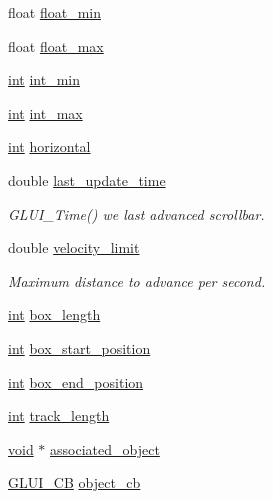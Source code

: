 \begin{DoxyCompactItemize}
float \hyperlink{class_g_l_u_i___scrollbar_ac758eab57fb82a16a44450941ec4ff2c}{float\+\_\+min}
\item 
float \hyperlink{class_g_l_u_i___scrollbar_aa903ec06872ab647be22bbbf392f0061}{float\+\_\+max}
\item 
\hyperlink{wglext_8h_a500a82aecba06f4550f6849b8099ca21}{int} \hyperlink{class_g_l_u_i___scrollbar_a984c4451659fe22bf37ef5f1059c45d2}{int\+\_\+min}
\item 
\hyperlink{wglext_8h_a500a82aecba06f4550f6849b8099ca21}{int} \hyperlink{class_g_l_u_i___scrollbar_af3438f0e574be6bf20478ef23ac630cf}{int\+\_\+max}
\item 
\hyperlink{wglext_8h_a500a82aecba06f4550f6849b8099ca21}{int} \hyperlink{class_g_l_u_i___scrollbar_a88e6346cf53594ae33a97d0fb1b630d3}{horizontal}
\item 
double \hyperlink{class_g_l_u_i___scrollbar_a413909d1d5c47657e963fb2ce30e2456}{last\+\_\+update\+\_\+time}
\begin{DoxyCompactList}\small\item\em G\+L\+U\+I\+\_\+\+Time() we last advanced scrollbar. \end{DoxyCompactList}\item 
double \hyperlink{class_g_l_u_i___scrollbar_a3d738432dded440f6733bdd95116622e}{velocity\+\_\+limit}
\begin{DoxyCompactList}\small\item\em Maximum distance to advance per second. \end{DoxyCompactList}\item 
\hyperlink{wglext_8h_a500a82aecba06f4550f6849b8099ca21}{int} \hyperlink{class_g_l_u_i___scrollbar_a9970e334cae062771414f55c0b846270}{box\+\_\+length}
\item 
\hyperlink{wglext_8h_a500a82aecba06f4550f6849b8099ca21}{int} \hyperlink{class_g_l_u_i___scrollbar_a6b7284df7537af88d8acdd643f807210}{box\+\_\+start\+\_\+position}
\item 
\hyperlink{wglext_8h_a500a82aecba06f4550f6849b8099ca21}{int} \hyperlink{class_g_l_u_i___scrollbar_a75a697d414c0efe18070ca93a0961091}{box\+\_\+end\+\_\+position}
\item 
\hyperlink{wglext_8h_a500a82aecba06f4550f6849b8099ca21}{int} \hyperlink{class_g_l_u_i___scrollbar_afdbce9591fda4c231f926d0f737b2dad}{track\+\_\+length}
\item 
\hyperlink{wglext_8h_a9e6b7f1933461ef318bb000d6bd13b83}{void} $\ast$ \hyperlink{class_g_l_u_i___scrollbar_a64562211dfbeda1a831b87f5116e639d}{associated\+\_\+object}
\item 
\hyperlink{class_g_l_u_i___c_b}{G\+L\+U\+I\+\_\+\+C\+B} \hyperlink{class_g_l_u_i___scrollbar_a16a50358fbc1f82d4c6932ea0eb93bef}{object\+\_\+cb}
\end{DoxyCompactItemize}
